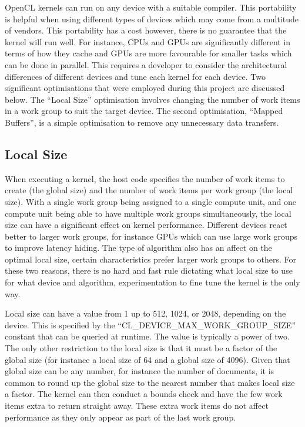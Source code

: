 OpenCL kernels can run on any device with a suitable compiler. This portability
is helpful when using different types of devices which may come from a multitude
of vendors. This portability has a cost however, there is no guarantee that the
kernel will run well. For instance, CPUs and GPUs are significantly different in
terms of how they cache and GPUs are more favourable for smaller tasks which can
be done in parallel. This requires a developer to consider the architectural
differences of different devices and tune each kernel for each device. Two
significant optimisations that were employed during this project are discussed
below. The ``Local Size'' optimisation involves changing the number of work
items in a work group to suit the target device. The second optimisation,
``Mapped Buffers'', is a simple optimisation to remove any unnecessary data
transfers.

\subsection{Local Size}

When executing a kernel, the host code specifies the number of work items to
create (the global size) and the number of work items per work group (the local
size). With a single work group being assigned to a single compute unit, and one
compute unit being able to have multiple work groups simultaneously, the local
size can have a significant effect on kernel performance. Different devices
react better to larger work groups, for instance GPUs which can use large work
groups to improve latency hiding. The type of algorithm also has an affect on
the optimal local size, certain characteristics prefer larger work groups to
others. For these two reasons, there is no hard and fast rule dictating what
local size to use for what device and algorithm, experimentation to fine tune
the kernel is the only way.

Local size can have a value from 1 up to 512, 1024, or 2048, depending on the
device. This is specified by the ``CL\_DEVICE\_MAX\_WORK\_GROUP\_SIZE'' constant
that can be queried at runtime. The value is typically a power of two. The only
other restriction to the local size is that it must be a factor of the global
size (for instance a local size of 64 and a global size of 4096). Given that
global size can be any number, for instance the number of documents, it is
common to round up the global size to the nearest number that makes local size a
factor. The kernel can then conduct a bounds check and have the few work items
extra to return straight away. These extra work items do not affect performance
as they only appear as part of the last work group.

